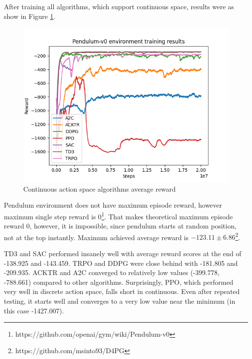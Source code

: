 \documentclass[12pt, a4paper]{article}
\begin{document}
After training all algorithms, which support continuous space, results were as show in Figure \ref{ContinuousRewardGraph}. 
\begin{figure}[H]
    \centering
    \includegraphics[width=1\linewidth]{images/pendulum_results.png}
    \caption{Continuous action space algorithms average reward}
    \label{ContinuousRewardGraph}
\end{figure}

Pendulum environment does not have maximum episode reward, however maximum single step reward is 0\footnote{https://github.com/openai/gym/wiki/Pendulum-v0}. That makes theoretical maximum episode reward 0, however, it is impossible, since pendulum starts at random position, not at the top instantly. Maximum achieved average reward is $-123.11 \pm 6.86$\footnote{https://github.com/msinto93/D4PG}.

TD3 and SAC performed insanely well with average reward scores at the end of -138.925 and -143.459. TRPO and DDPG were close behind with -181.805 and -209.935. ACKTR and A2C converged to relatively low values (-399.778, -788.661) compared to other algorithms.
Surprisingly, PPO, which performed very well in discrete action space, falls short in continuous. Even after repeated testing, it starts well and converges to a very low value near the minimum (in this case -1427.007).
\end{document}
